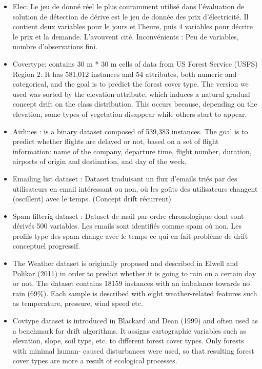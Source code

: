 \documentclass[11pt,a4paper]{report}
\begin{document}
\begin{itemize}

\item Elec: Le jeu de donné réel le plus couramment utilisé dans l'évaluation de solution de détection de dérive est le jeu de donnée des prix d’électricité. Il contient deux variables pour le jours et l’heure, puis 4 variables pour décrire le prix et la demande.
L'avouvent cité.
Inconvénients : Peu de variables, nombre d’observations fini.


\item Covertype: contains 30 m * 30 m cells of data from US Forest Service (USFS) Region 2. It has 581,012 instances and 54 attributes, both numeric and categorical, and the goal is to predict the forest cover type. The version we used was sorted by the elevation attribute, which induces a natural gradual concept drift on the class distribution. This occurs because, depending on the elevation, some types of vegetation disappear while others start to appear. 

\item Airlines : is a binary dataset composed of 539,383 instances. The goal is to predict whether flights are delayed or not, based on a set of flight information: name of the company, departure time, flight number, duration, airports of origin and destination, and day of the week. 

\item Emailing list dataset : Dataset traduisant un flux d’emails triés par des utilisateurs en email intéressant ou non, où les goûts des utilisateurs changent (oscillent) avec le temps. (Concept drift récurrent)

\item Spam filterig dataset : Dataset de mail par ordre chronologique dont sont dérivés 500 variables. Les emails sont identifiés comme spam où non. Les profils type des spam change avec le temps ce qui en fait problème de drift conceptuel progressif.

\item The Weather dataset is originally proposed and described in Elwell and Polikar (2011) in order to predict whether it is going to rain on a certain day or not. The dataset contains 18159 instances with an imbalance towards no rain (69\%). Each sample is described with eight weather-related features such as temperature, pressure, wind speed etc. 

\item Covtype dataset is introduced in Blackard and Dean (1999) and often used as a benchmark for drift algorithms. It assigns cartographic variables such as elevation, slope, soil type, etc. to different forest cover types. Only forests with minimal human- caused disturbances were used, so that resulting forest cover types are more a result of ecological processes. 


\end{itemize}
\end{document}
